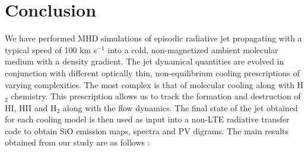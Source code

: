 \documentclass[useAMS,usenatbib]{mn2e}
\begin{document}
 
\section{Conclusion}
\label{sec:conclusion}
We have performed MHD simulations
of episodic radiative jet propagating 
with a typical speed of 100 km s$^{-1}$ into a cold, non-magnetized ambient
molecular medium with a density gradient. The jet dynamical quantities are evolved in conjunction
with different optically thin, non-equilibrium cooling prescriptions of varying complexities. 
The most complex is that of molecular cooling along with
H$_2$ chemistry. This prescription allows us to track the formation
and destruction of HI, HII and H$_2$ along with the flow dynamics. 
The final state of the jet obtained for each cooling model is then
used as input into a non-LTE radiative transfer code to
obtain SiO emission maps, spectra and PV digrams. The main results
obtained from our study are as follows :
\end{document}
